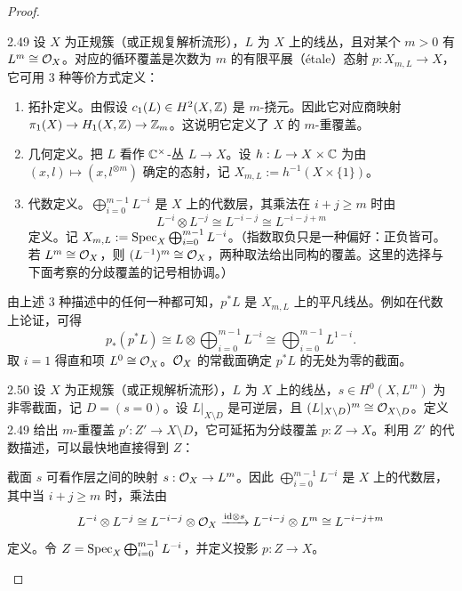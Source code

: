 \begin{proof}
\begin{definition}[不分歧循环覆盖]{2.49}
设 $X$ 为正规簇（或正规复解析流形），$L$ 为 $X$ 上的线丛，且对某个 $m>0$ 有 $L^m\cong\mathcal{O}_X$。对应的循环覆盖是次数为 $m$ 的有限平展（étale）态射 $p:X_{m,L}\to X$，它可用 3 种等价方式定义：
\begin{enumerate}[label=（\arabic*）,leftmargin=2.8em]
\item 拓扑定义。由假设 $c_1(L)\in H^2(X,\mathbb{Z})$ 是 $m$-挠元。因此它对应商映射 $\pi_1(X)\to H_1(X,\mathbb{Z})\to\mathbb{Z}_m$。这说明它定义了 $X$ 的 $m$-重覆盖。
\item 几何定义。把 $L$ 看作 $\mathbb{C}^\times$-丛 $L\to X$。设 $h:L\to X\times\mathbb{C}$ 为由 $(x,l)\mapsto(x,l^{\otimes m})$ 确定的态射，记 $X_{m,L}:=h^{-1}(X\times\{1\})$。
\item 代数定义。$\bigoplus_{i=0}^{m-1}L^{-i}$ 是 $X$ 上的代数层，其乘法在 $i+j\ge m$ 时由
\[
L^{-i}\otimes L^{-j}\cong L^{-i-j}\cong L^{-i-j+m}
\]
定义。记 $X_{m,L}:=\operatorname{Spec}_X\bigoplus_{i=0}^{m-1}L^{-i}$。（指数取负只是一种偏好：正负皆可。若 $L^m\cong\mathcal{O}_X$，则 $(L^{-1})^m\cong\mathcal{O}_X$，两种取法给出同构的覆盖。这里的选择与下面考察的分歧覆盖的记号相协调。）
\end{enumerate}
由上述 3 种描述中的任何一种都可知，$p^*L$ 是 $X_{m,L}$ 上的平凡线丛。例如在代数上论证，可得
\[
p_*(p^*L)\cong L\otimes\bigoplus_{i=0}^{m-1}L^{-i}\cong\bigoplus_{i=0}^{m-1}L^{1-i}.
\]
取 $i=1$ 得直和项 $L^0\cong\mathcal{O}_X$。$\mathcal{O}_X$ 的常截面确定 $p^*L$ 的无处为零的截面。
\end{definition}


\begin{definition}{2.50}
设 $X$ 为正规簇（或正规解析流形），$L$ 为 $X$ 上的线丛，$s\in H^0(X,L^m)$ 为非零截面，记 $D=(s=0)$。设 $L|_{X\setminus D}$ 是可逆层，且 $(L|_{X\setminus D})^m\cong\mathcal{O}_{X\setminus D}$。定义 2.49 给出 $m$-重覆盖 $p':Z'\to X\setminus D$，它可延拓为分歧覆盖 $p:Z\to X$。利用 $Z'$ 的代数描述，可以最快地直接得到 $Z$：

截面 $s$ 可看作层之间的映射 $s:\mathcal{O}_X\to L^m$。因此 $\bigoplus_{i=0}^{m-1}L^{-i}$ 是 $X$ 上的代数层，其中当 $i+j\ge m$ 时，乘法由
\[
L^{-i}\otimes L^{-j}\cong L^{-i-j}\otimes\mathcal{O}_X\xrightarrow{\mathrm{id}\otimes s}L^{-i-j}\otimes L^m\cong L^{-i-j+m}
\]
定义。令 $Z=\operatorname{Spec}_X\bigoplus_{i=0}^{m-1}L^{-i}$，并定义投影 $p:Z\to X$。
\end{definition}


\end{proof}

